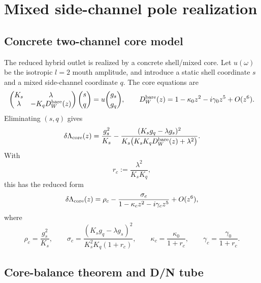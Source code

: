 \section{Mixed side-channel pole realization}
\label{sec:part04_geometry_retarded_mouth:mixed-side-channel-pole-realization}

\subsection{Concrete two-channel core model}
\label{subsec:part04-two-channel-core}

The reduced hybrid outlet is realized by a concrete shell/mixed core.  Let \(u(\omega)\) be the isotropic \(l=2\) mouth amplitude, and introduce a static shell coordinate \(s\) and a mixed side-channel coordinate \(q\).  The core equations are
\begin{equation}
\label{eq:part04-core-matrix}
\begin{pmatrix}
K_s & \lambda\\
\lambda & -K_qD_W^{\rm bare}(z)
\end{pmatrix}
\binom{s}{q}
=
u
\binom{g_s}{g_q},
\qquad
D_W^{\rm bare}(z)=1-\kappa_0z^2-i\gamma_0z^5+O(z^6).
\end{equation}
Eliminating \((s,q)\) gives
\begin{equation}
\label{eq:part04-core-schur}
\delta\Lambda_{\rm core}(z)
=
\frac{g_s^2}{K_s}
-
\frac{(K_sg_q-\lambda g_s)^2}{K_s\bigl(K_sK_qD_W^{\rm bare}(z)+\lambda^2\bigr)}.
\end{equation}
With
\begin{equation}
\label{eq:part04-rc-def}
r_c:=\frac{\lambda^2}{K_sK_q},
\end{equation}
this has the reduced form
\begin{equation}
\label{eq:part04-core-reduced-rho-sigma}
\delta\Lambda_{\rm core}(z)
=
\rho_c-\frac{\sigma_c}{1-\kappa_cz^2-i\gamma_cz^5}+O(z^6),
\end{equation}
where
\begin{equation}
\label{eq:part04-core-identifications}
\rho_c=\frac{g_s^2}{K_s},
\qquad
\sigma_c=\frac{(K_sg_q-\lambda g_s)^2}{K_s^2K_q(1+r_c)},
\qquad
\kappa_c=\frac{\kappa_0}{1+r_c},
\qquad
\gamma_c=\frac{\gamma_0}{1+r_c}.
\end{equation}

\subsection{Core-balance theorem and D/N tube}
\label{subsec:part04-core-balance}

